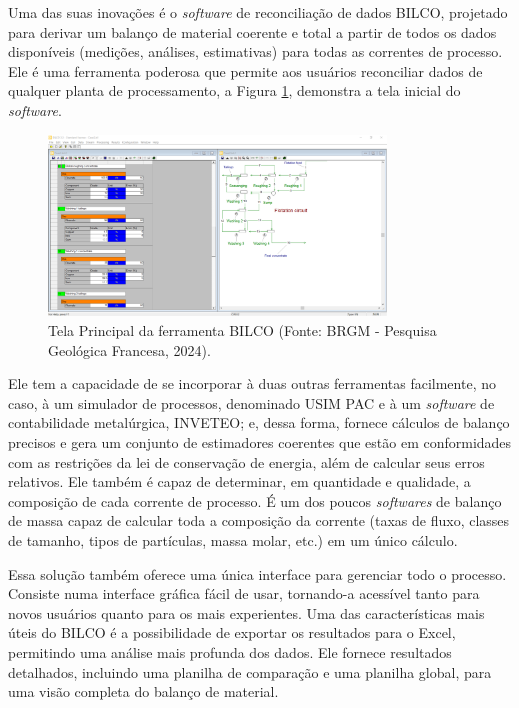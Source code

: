 Uma das suas inovações é o \textit{software} de reconciliação de dados BILCO, projetado para derivar um balanço de material coerente e total a partir de todos os dados disponíveis (medições, análises, estimativas) para todas as correntes de processo. Ele é uma ferramenta poderosa que permite aos usuários reconciliar dados de qualquer planta de processamento, a Figura \ref{fig:BILCO}, demonstra a tela inicial do \textit{software}.

\begin{figure}[htbp!]
	\centering
	\includegraphics[width=0.8\textwidth]{figuras/BILCOCASPEOP.png}
	\caption{Tela Principal da ferramenta BILCO (Fonte: BRGM - Pesquisa Geológica Francesa, 2024).}
	\label{fig:BILCO}
\end{figure}

Ele tem a capacidade de se incorporar à duas outras ferramentas facilmente, no caso, à um simulador de processos, denominado USIM PAC e à um \textit{software} de contabilidade metalúrgica, INVETEO; e, dessa forma, fornece cálculos de balanço precisos e gera um conjunto de estimadores coerentes que estão em conformidades com as restrições da lei de conservação de energia, além de calcular seus erros relativos. Ele também é capaz de determinar, em quantidade e qualidade, a composição de cada corrente de processo. É um dos poucos \textit{softwares} de balanço de massa capaz de calcular toda a composição da corrente (taxas de fluxo, classes de tamanho, tipos de partículas, massa molar, etc.) em um único cálculo.

Essa solução também oferece uma única interface para gerenciar todo o processo. Consiste numa interface gráfica fácil de usar, tornando-a acessível tanto para novos usuários quanto para os mais experientes. Uma das características mais úteis do BILCO é a possibilidade de exportar os resultados para o Excel, permitindo uma análise mais profunda dos dados. Ele fornece resultados detalhados, incluindo uma planilha de comparação e uma planilha global, para uma visão completa do balanço de material.

